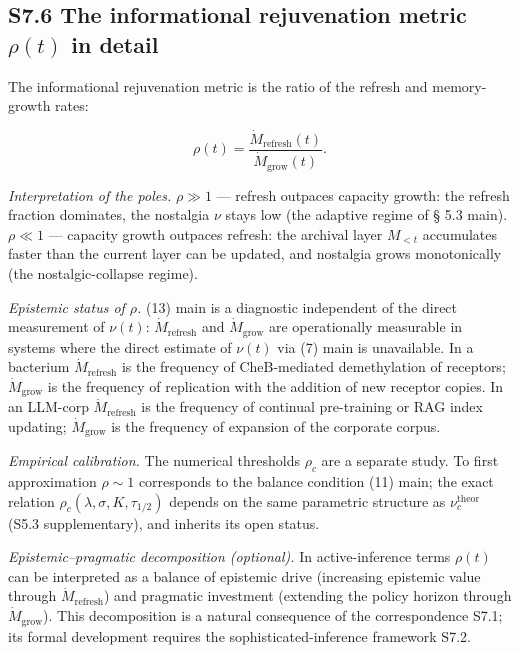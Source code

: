\documentclass[pdflatex,sn-mathphys-ay]{sn-jnl}
\providecommand{\lt}{<}\providecommand{\gt}{>}
\begin{document}
\subsection*{\texorpdfstring{S7.6 The informational rejuvenation metric \(\rho(t)\) in detail}{S7.6 The informational rejuvenation metric \textbackslash rho(t) in detail}}\label{s7.6-the-informational-rejuvenation-metric-rhot-in-detail}



The informational rejuvenation metric is the ratio of the refresh and memory-growth rates:



\[\rho(t) = \frac{\dot{M}_{\text{refresh}}(t)}{\dot{M}_{\text{grow}}(t)}.\]



\emph{Interpretation of the poles.} \(\rho \gg 1\) --- refresh outpaces capacity growth: the refresh fraction dominates, the nostalgia \(\nu\) stays low (the adaptive regime of § 5.3 main). \(\rho \ll 1\) --- capacity growth outpaces refresh: the archival layer \(M_{\lt t}\) accumulates faster than the current layer can be updated, and nostalgia grows monotonically (the nostalgic-collapse regime).



\emph{Epistemic status of \(\rho\).} (13) main is a diagnostic independent of the direct measurement of \(\nu(t)\): \(\dot{M}_{\text{refresh}}\) and \(\dot{M}_{\text{grow}}\) are operationally measurable in systems where the direct estimate of \(\nu(t)\) via (7) main is unavailable. In a bacterium \(\dot M_{\text{refresh}}\) is the frequency of CheB-mediated demethylation of receptors; \(\dot M_{\text{grow}}\) is the frequency of replication with the addition of new receptor copies. In an LLM-corp \(\dot M_{\text{refresh}}\) is the frequency of continual pre-training or RAG index updating; \(\dot M_{\text{grow}}\) is the frequency of expansion of the corporate corpus.



\emph{Empirical calibration.} The numerical thresholds \(\rho_c\) are a separate study. To first approximation \(\rho \sim 1\) corresponds to the balance condition (11) main; the exact relation \(\rho_c(\lambda, \sigma, K, \tau_{1/2})\) depends on the same parametric structure as \(\nu_c^{\text{theor}}\) (S5.3 supplementary), and inherits its open status.



\emph{Epistemic--pragmatic decomposition (optional).} In active-inference terms \(\rho(t)\) can be interpreted as a balance of epistemic drive (increasing epistemic value through \(\dot{M}_{\text{refresh}}\)) and pragmatic investment (extending the policy horizon through \(\dot{M}_{\text{grow}}\)). This decomposition is a natural consequence of the correspondence S7.1; its formal development requires the sophisticated-inference framework S7.2.
\end{document}
